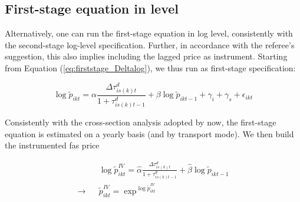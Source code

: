 \documentclass[a4paper,12pt]{article}
\begin{document}
\subsection{First-stage equation in level}

Alternatively, one can run the first-stage equation in log level, consistently with the second-stage log-level specification. Further, in accordance with the referee's suggestion, this also implies including the lagged price as instrument. Starting from Equation (\ref{eq:firststage_Deltalog}), we thus run as first-stage specification:


\begin{equation}
\log \widetilde{p}_{ikt} = \alpha\frac{\Delta \tau^d_{is(k)t}}{1+\tau_{is(k)t-1}^d} + \beta \log\widetilde{p}_{ikt-1}  +\gamma_{i} +\gamma_{s}+\epsilon_{ikt} \label{eq:firststage_log}
\end{equation}

Consistently with the cross-section analysis adopted by now, the first-stage equation is estimated on a yearly basis (and by transport mode). We then build the instrumented fas price

\begin{eqnarray*}
&&\log \widetilde{p}_{ikt}^{IV} = \widehat{\alpha}\frac{\Delta \tau^d_{is(k)t}}{1+\tau_{is(k)t-1}^d} + \widehat{\beta}\log\widetilde{p}_{ikt-1} \\
\rightarrow &&\widetilde{p}_{ikt}^{IV}  = \exp^{\log \widetilde{p}_{ikt}^{IV}}
\end{eqnarray*}
\end{document}
